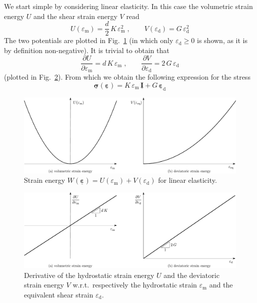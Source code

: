 \documentclass[times,namecite]{goose-article}
\newcommand\T[1]{\underline{\bm{{#1}}}}
\begin{document}
We start simple by considering linear elasticity. In this case the volumetric strain energy $U$ and the shear strain energy $V$ read
\begin{equation}\label{eq:W:elas}
  U ( \varepsilon_\mathrm{m}  ) = \frac{d}{2} \, K \, \varepsilon_\mathrm{m}^2
  \;, \qquad
  V ( \varepsilon_\mathrm{d} ) = G \, \varepsilon_\mathrm{d}^2
\end{equation}
The two potentials are plotted in Fig.~\ref{fig:U-V:elas} (in which only $\varepsilon_\mathrm{d} \geq 0$ is shown, as it is by definition non-negative). It is trivial to obtain that
\begin{equation}
  \frac{\partial U}{\partial \varepsilon_\mathrm{m}}
  =
  d \, K \, \varepsilon_\mathrm{m}
  \;, \qquad
  \frac{\partial V}{\partial \varepsilon_\mathrm{d}}
  =
  2 \, G \, \varepsilon_\mathrm{d}
\end{equation}
(plotted in Fig.~\ref{fig:dU-dV:elas}). From which we obtain the following expression for the stress
\begin{equation}\label{eq:sig-elas}
  \T{\sigma} ( \T{\varepsilon} )
  =
  K \, \varepsilon_\mathrm{m} \, \T{I}
  +
  G \, \T{\varepsilon}_\mathrm{d}
\end{equation}

\begin{figure}[htp]
  \centering
  \includegraphics[width=1.\textwidth]{figures/potential_U-V_elas}
  \caption{Strain energy $W ( \T{\varepsilon} ) = U ( \varepsilon_\mathrm{m} ) + V ( \varepsilon_\mathrm{d} )$ for linear elasticity.}
  \label{fig:U-V:elas}
\end{figure}

\begin{figure}[htp]
  \centering
  \includegraphics[width=1.\textwidth]{figures/potential_dU-dV_elas}
  \caption{Derivative of the hydrostatic strain energy $U$ and the deviatoric strain energy $V$ w.r.t.\ respectively the hydrostatic strain $\varepsilon_\mathrm{m}$ and the equivalent shear strain $\varepsilon_\mathrm{d}$.}
  \label{fig:dU-dV:elas}
\end{figure}
\end{document}
